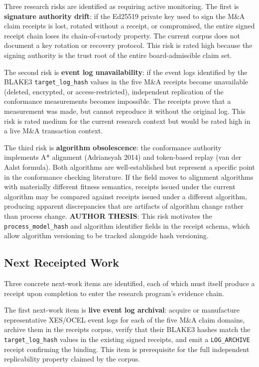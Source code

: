 Three research risks are identified as requiring active monitoring. The first is
\textbf{signature authority drift}: if the Ed25519 private key used to sign the M\&A
claim receipts is lost, rotated without a receipt, or compromised, the entire signed
receipt chain loses its chain-of-custody property. The current corpus does not document
a key rotation or recovery protocol. This risk is rated high because the signing
authority is the trust root of the entire board-admissible claim set.

The second risk is \textbf{event log unavailability}: if the event logs identified by
the BLAKE3 \texttt{target\_log\_hash} values in the five M\&A receipts become unavailable
(deleted, encrypted, or access-restricted), independent replication of the conformance
measurements becomes impossible. The receipts prove that a measurement was made, but
cannot reproduce it without the original log. This risk is rated medium for the current
research context but would be rated high in a live M\&A transaction context.

The third risk is \textbf{algorithm obsolescence}: the conformance authority implements
A* alignment (Adriansyah 2014) and token-based replay (van der Aalst formula). Both
algorithms are well-established but represent a specific point in the conformance
checking literature. If the field moves to alignment algorithms with materially
different fitness semantics, receipts issued under the current algorithm may be
compared against receipts issued under a different algorithm, producing apparent
discrepancies that are artifacts of algorithm change rather than process change.
\textbf{AUTHOR THESIS}: This risk motivates the \texttt{process\_model\_hash}
and algorithm identifier fields in the receipt schema, which allow algorithm
versioning to be tracked alongside hash versioning.

\subsection{Next Receipted Work}
\label{sec:receipts-questions-next}

Three concrete next-work items are identified, each of which must itself produce
a receipt upon completion to enter the research program's evidence chain.

The first next-work item is \textbf{live event log archival}: acquire or manufacture
representative XES/OCEL event logs for each of the five M\&A claim domains, archive
them in the receipts corpus, verify that their BLAKE3 hashes match the
\texttt{target\_log\_hash} values in the existing signed receipts, and emit a
\texttt{LOG\_ARCHIVE} receipt confirming the binding. This item is prerequisite for
the full independent replicability property claimed by the corpus.

